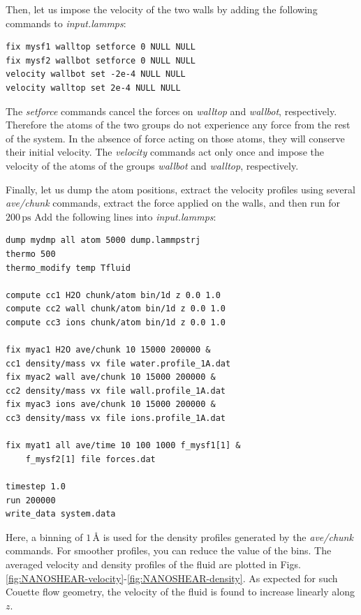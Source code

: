 \documentclass[9pt,tutorial]{livecoms}
\begin{document}
Then, let us impose the velocity of the two walls by adding the following commands to \textit{input.lammps}:
{\normalsize \begin{verbatim}
fix mysf1 walltop setforce 0 NULL NULL
fix mysf2 wallbot setforce 0 NULL NULL
velocity wallbot set -2e-4 NULL NULL
velocity walltop set 2e-4 NULL NULL
\end{verbatim}}
The \textit{setforce} commands cancel the forces on \textit{walltop} and \textit{wallbot}, respectively. Therefore the atoms of the two groups do not experience any force from the rest of the system. In the absence of force acting on those atoms, they will conserve their initial velocity. The \textit{velocity} commands act only once and impose the velocity of the atoms of the groups \textit{wallbot} and \textit{walltop}, respectively.

Finally, let us dump the atom positions, extract the velocity profiles using several \textit{ave/chunk} commands, extract the
force applied on the walls, and then run for $200\,\text{ps}$ Add the following lines into \textit{input.lammps}:
{\normalsize \begin{verbatim}
dump mydmp all atom 5000 dump.lammpstrj
thermo 500
thermo_modify temp Tfluid

compute cc1 H2O chunk/atom bin/1d z 0.0 1.0
compute cc2 wall chunk/atom bin/1d z 0.0 1.0
compute cc3 ions chunk/atom bin/1d z 0.0 1.0

fix myac1 H2O ave/chunk 10 15000 200000 &
cc1 density/mass vx file water.profile_1A.dat
fix myac2 wall ave/chunk 10 15000 200000 &
cc2 density/mass vx file wall.profile_1A.dat
fix myac3 ions ave/chunk 10 15000 200000 &
cc3 density/mass vx file ions.profile_1A.dat

fix myat1 all ave/time 10 100 1000 f_mysf1[1] &
    f_mysf2[1] file forces.dat

timestep 1.0
run 200000
write_data system.data
\end{verbatim}}
Here, a binning of $1\,\text{\AA{}}$ is used for the density profiles generated by the \textit{ave/chunk} commands. For smoother profiles, you can reduce the value of the bins. The averaged velocity and density profiles of the fluid are plotted in Figs.\ref{fig:NANOSHEAR-velocity}-\ref{fig:NANOSHEAR-density}. As expected for such Couette flow geometry, the velocity of the fluid is found to increase linearly along $z$.
\end{document}
